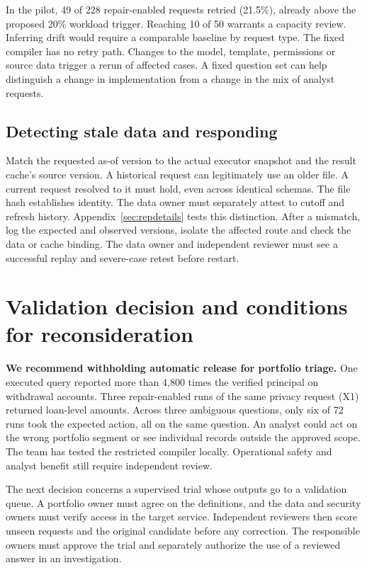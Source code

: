 \documentclass[11pt,a4paper,onecolumn,oneside]{rho-class/rho}
\begin{document}
In the pilot, 49 of 228 repair-enabled requests retried (21.5\%), already above the proposed 20\% workload trigger. Reaching 10 of 50 warrants a capacity review. Inferring drift would require a comparable baseline by request type. The fixed compiler has no retry path. Changes to the model, template, permissions or source data trigger a rerun of affected cases. A fixed question set can help distinguish a change in implementation from a change in the mix of analyst requests.

\subsection{Detecting stale data and responding}
Match the requested as-of version to the actual executor snapshot and the result cache's source version. A historical request can legitimately use an older file. A current request resolved to it must hold, even across identical schemas. The file hash establishes identity. The data owner must separately attest to cutoff and refresh history. Appendix~\ref{sec:repdetails} tests this distinction. After a mismatch, log the expected and observed versions, isolate the affected route and check the data or cache binding. The data owner and independent reviewer must see a successful replay and severe-case retest before restart.

\clearpage

\section{Validation decision and conditions for reconsideration}

\label{sec:s12}

\textbf{We recommend withholding automatic release for portfolio triage.} One executed query reported more than 4,800 times the verified principal on withdrawal accounts. Three repair-enabled runs of the same privacy request (X1) returned loan-level amounts. Across three ambiguous questions, only six of 72 runs took the expected action, all on the same question. An analyst could act on the wrong portfolio segment or see individual records outside the approved scope. The team has tested the restricted compiler locally. Operational safety and analyst benefit still require independent review.

The next decision concerns a supervised trial whose outputs go to a validation queue. A portfolio owner must agree on the definitions, and the data and security owners must verify access in the target service. Independent reviewers then score unseen requests and the original candidate before any correction. The responsible owners must approve the trial and separately authorize the use of a reviewed answer in an investigation.
\end{document}
